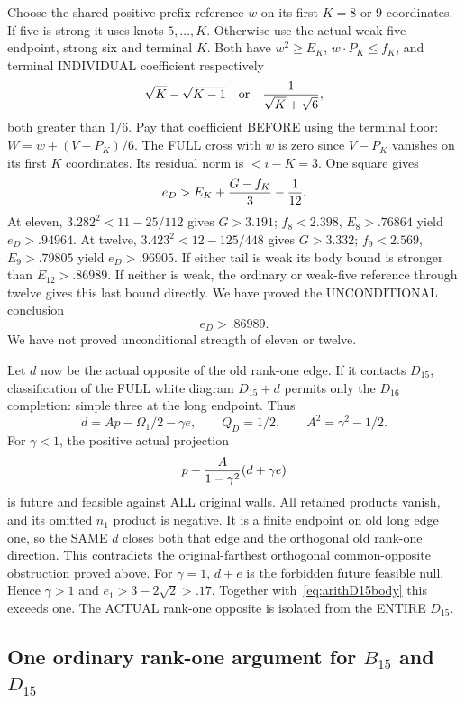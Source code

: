 Choose the shared positive prefix reference \(w\)
on its first \(K=8\) or \(9\) coordinates.
If five is strong it uses knots \(5,\ldots,K\).
Otherwise use the actual weak-five endpoint,
strong six and terminal \(K\).
Both have \(w^2\ge E_K\), \(w\cdot P_K\le f_K\),
and terminal INDIVIDUAL coefficient respectively
\[
 \sqrt K-\sqrt{K-1}\quad\hbox{or}\quad
 {1\over\sqrt K+\sqrt6},
\]
both greater than \(1/6\).
Pay that coefficient BEFORE using the terminal floor:
\(W=w+(V-P_K)/6\).
The FULL cross with \(w\) is zero since \(V-P_K\)
vanishes on its first \(K\) coordinates.
Its residual norm is \(<i-K=3\).
One square gives
\[
                 e_D>E_K+{G-f_K\over3}-{1\over12}.
\]
At eleven,
\(3.282^2<11-25/112\) gives \(G>3.191\);
\(f_8<2.398\), \(E_8>.76864\) yield \(e_D>.94964\).
At twelve,
\(3.423^2<12-125/448\) gives \(G>3.332\);
\(f_9<2.569\), \(E_9>.79805\) yield \(e_D>.96905\).
If either tail is weak its body bound is stronger than
\(E_{12}>.86989\).
If neither is weak, the ordinary or weak-five reference
through twelve gives this last bound directly.
We have proved the UNCONDITIONAL conclusion
\[
                         e_D>.86989 .
\tag{R1D}\label{eq:arithD15body}
\]
We have not proved unconditional strength of eleven or twelve.

Let \(d\) now be the actual opposite of the old rank-one edge.
If it contacts \(D_{15}\), classification of the FULL
white diagram \(D_{15}+d\) permits only the \(D_{16}\)
completion: simple three at the long endpoint.
Thus
\[
 d=Ap-\Omega_1/2-\gamma e,\qquad
 Q_D=1/2,\qquad A^2=\gamma^2-1/2 .
\]
For \(\gamma<1\), the positive actual projection
\[
                  p+{A\over1-\gamma^2}(d+\gamma e)
\]
is future and feasible against ALL original walls.
All retained products vanish, and its omitted \(n_1\)
product is negative.
It is a finite endpoint on old long edge one, so the
SAME \(d\) closes both that edge and the orthogonal
old rank-one direction.
This contradicts the original-farthest orthogonal
common-opposite obstruction proved above.
For \(\gamma=1\), \(d+e\) is the forbidden future
feasible null.
Hence \(\gamma>1\) and
\(e_1>3-2\sqrt2>.17\).
Together with~\eqref{eq:arithD15body} this exceeds one.
The ACTUAL rank-one opposite is isolated from the
ENTIRE \(D_{15}\).

\subsection{One ordinary rank-one argument for \(B_{15}\) and \(D_{15}\)}
\label{app:arithBD15ordinary}

